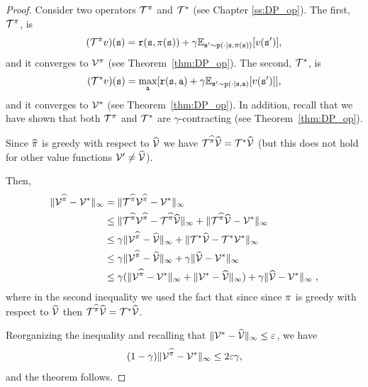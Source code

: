 \begin{proof}
Consider two operators $\mathcal{T}^\pi$ and $\mathcal{T}^*$ (see
Chapter \ref{ss:DP_op}). The first, $\mathcal{T}^\pi$, is
\[
(\mathcal{T}^\pi v)({\tt s})={\tt r}({\tt s},\pi({\tt s}))+\gamma
\mathbb{E}_{{\tt s}'\sim {\tt p}(\cdot|{\tt s},\pi({\tt s}))}[v({\tt s}')],
\]
and it converges to $\mathcal{V}^\pi$ (see Theorem~\ref{thm:DP_op}).
The second, $\mathcal{T}^*$, is
\[
(\mathcal{T}^* v)({\tt s})=\max_{\tt a}[{\tt r}({\tt s},{\tt a})+\gamma
\mathbb{E}_{{\tt s}'\sim {\tt p}(\cdot|{\tt s},{\tt a})}[v({\tt s}')] ],
\]
and it converges to $\mathcal{V}^*$ (see Theorem~\ref{thm:DP_op}).
In addition, recall that we have shown that both
$\mathcal{T}^\pi$ and $\mathcal{T}^*$ are $\gamma$-contracting (see
Theorem~\ref{thm:DP_op}).

Since $\widehat{\pi}$ is greedy with respect to $\widehat{\mathcal{V}}$ we have
$\mathcal{T}^{\widehat{\pi}} \widehat{\mathcal{V}}=\mathcal{T}^* \widehat{\mathcal{V}}$ (but this does not hold for
other value functions $\mathcal{V}' \neq \widehat{\mathcal{V}}$).

Then,
\begin{align*}
\|\mathcal{V}^{\widehat{\pi}}-\mathcal{V}^*\|_\infty &= \|\mathcal{T}^{\widehat{\pi}} \mathcal{V}^{\widehat{\pi}} - \mathcal{V}^*\|_\infty\\
&\leq \|\mathcal{T}^{\widehat{\pi}} \mathcal{V}^{\widehat{\pi}} -\mathcal{T}^{\widehat{\pi}} \widehat{\mathcal{V}}\|_\infty +\|\mathcal{T}^{\widehat{\pi}} \widehat{\mathcal{V}} - \mathcal{V}^*\|_\infty\\
&\leq \gamma\| \mathcal{V}^{\widehat{\pi}} - \widehat{\mathcal{V}}\|_\infty +\|\mathcal{T}^* \widehat{\mathcal{V}} - \mathcal{T}^*\mathcal{V}^*\|_\infty\\
&\leq \gamma\| \mathcal{V}^{\widehat{\pi}} - \widehat{\mathcal{V}}\|_\infty +\gamma\| \widehat{\mathcal{V}} - \mathcal{V}^*\|_\infty\\
&\leq \gamma(\| \mathcal{V}^{\widehat{\pi}} - \mathcal{V}^*\|_\infty+ \|\mathcal{V}^*-\widehat{\mathcal{V}}\|_\infty ) +\gamma\| \widehat{\mathcal{V}} - \mathcal{V}^*\|_\infty\;,
\end{align*}
where in the second inequality we used the fact that since since
$\pi$ is greedy with respect to $\widehat{\mathcal{V}}$ then $\mathcal{T}^{\widehat{\pi}} \widehat{\mathcal{V}}=\mathcal{T}^* \widehat{\mathcal{V}}$.

Reorganizing the inequality and recalling that
$\|\mathcal{V}^*-\widehat{\mathcal{V}}\|_\infty\leq \varepsilon$, we have
\[
(1-\gamma)\|\mathcal{V}^{\widehat{\pi}}-\mathcal{V}^*\|_\infty \leq 2\varepsilon\gamma,
\]
and the theorem follows.
\end{proof}


